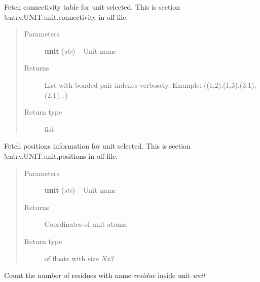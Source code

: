 \documentclass[letterpaper,10pt,english]{sphinxmanual}
\begin{document}
\begin{fulllineitems}
\begin{fulllineitems}
\label{OFFManager:pyMDMix.OFFManager.OFFManager.getConnectivity}
Fetch connectivity table for unit selected.
This is section !entry.UNIT.unit.connectivity in off file.
\begin{quote}\begin{description}
\item[{Parameters}] \leavevmode
\textbf{unit} (\emph{str}) -- Unit name

\item[{Returns}] \leavevmode
List with bonded pair indexes verbosely. Example: ((1,2),(1,3),(3,1),(2,1)...)

\item[{Return type}] \leavevmode
list

\end{description}\end{quote}

\end{fulllineitems}


\begin{fulllineitems}
\label{OFFManager:pyMDMix.OFFManager.OFFManager.getCoords}
Fetch positions information for unit selected.
This is section !entry.UNIT.unit.positions in off file.
\begin{quote}\begin{description}
\item[{Parameters}] \leavevmode
\textbf{unit} (\emph{str}) -- Unit name

\item[{Returns}] \leavevmode
Coordinates of unit atoms.

\item[{Return type}] \leavevmode
{} of floats with size \emph{Nx3}

\end{description}\end{quote}

\end{fulllineitems}


\begin{fulllineitems}
\label{OFFManager:pyMDMix.OFFManager.OFFManager.getNumRes}
Count the number of residues with name \emph{residue} inside unit \emph{unit}


\end{fulllineitems}
\end{fulllineitems}
\end{document}
